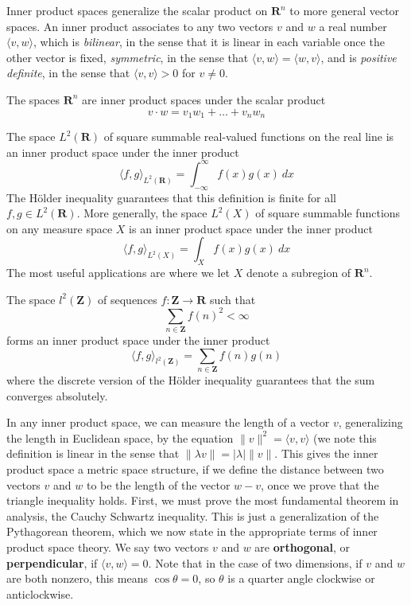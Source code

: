 Inner product spaces generalize the scalar product on $\mathbf{R}^n$ to more general vector spaces. An inner product associates to any two vectors $v$ and $w$ a real number $\langle v, w \rangle$, which is {\it bilinear}, in the sense that it is linear in each variable once the other vector is fixed, {\it symmetric}, in the sense that $\langle v, w \rangle = \langle w, v \rangle$, and is {\it positive definite}, in the sense that $\langle v, v \rangle > 0$ for $v \neq 0$.

\begin{example}
    The spaces $\mathbf{R}^n$ are inner product spaces under the scalar product
    \[ v \cdot w = v_1w_1 + \dots + v_nw_n \]
\end{example}

\begin{example}
    The space $L^2(\mathbf{R})$ of square summable real-valued functions on the real line is an inner product space under the inner product
    \[ \langle f, g \rangle_{L^2(\mathbf{R})} = \int_{-\infty}^\infty f(x) g(x)\ dx \]
    The H\"{o}lder inequality guarantees that this definition is finite for all $f,g \in L^2(\mathbf{R})$. More generally, the space $L^2(X)$ of square summable functions on any measure space $X$ is an inner product space under the inner product
    \[ \langle f, g \rangle_{L^2(X)} = \int_X f(x) g(x)\ dx \]
    The most useful applications are where we let $X$ denote a subregion of $\mathbf{R}^n$.
\end{example}

\begin{example}
    The space $l^2(\mathbf{Z})$ of sequences $f: \mathbf{Z} \to \mathbf{R}$ such that
    \[ \sum_{n \in \mathbf{Z}} f(n)^2 < \infty \]
    forms an inner product space under the inner product
    \[ \langle f, g \rangle_{l^2(\mathbf{Z})} = \sum_{n \in \mathbf{Z}} f(n)g(n) \]
    where the discrete version of the H\"{o}lder inequality guarantees that the sum converges absolutely.
\end{example}

In any inner product space, we can measure the length of a vector $v$, generalizing the length in Euclidean space, by the equation $\| v \|^2 = \langle v, v \rangle$ (we note this definition is linear in the sense that $\| \lambda v \| = |\lambda| \| v \|$. This gives the inner product space a metric space structure, if we define the distance between two vectors $v$ and $w$ to be the length of the vector $w - v$, once we prove that the triangle inequality holds. First, we must prove the most fundamental theorem in analysis, the Cauchy Schwartz inequality. This is just a generalization of the Pythagorean theorem, which we now state in the appropriate terms of inner product space theory. We say two vectors $v$ and $w$ are {\bf orthogonal}, or {\bf perpendicular}, if $\langle v, w \rangle = 0$. Note that in the case of two dimensions, if $v$ and $w$ are both nonzero, this means $\cos \theta = 0$, so $\theta$ is a quarter angle clockwise or anticlockwise.

